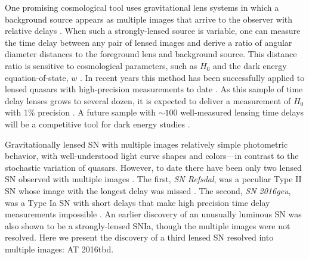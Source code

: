 \documentclass[12pt]{article}
\def\SNABC{AT 2016tbd\xspace}
\begin{document}
One promising cosmological tool uses %
gravitational lens systems in which a background
source appears as multiple images that arrive to the observer with relative delays \cite{einstein_lens_1936}.
When such a strongly-lensed source is variable, one can measure the time delay between any pair of lensed images and derive a ratio of angular diameter distances to the foreground lens and background source. 
This distance ratio is sensitive to cosmological parameters, such as 
$H_0$ \cite{refsdal_possibility_1964} and the dark energy equation-of-state, $w$ \cite{holz_seeing_2001}. 
In recent years this method has been successfully applied to lensed
quasars %
with  high-precision measurements to date . As this sample of time delay lenses grows to several dozen, it is expected to deliver a measurement of $H_0$ with 1\% precision \cite{suyu_cosmological_2018}. A future sample with $\sim100$ well-measured lensing time delays will be a competitive tool for dark energy studies \cite{treu_time_2016}.

Gravitationally lensed SN with multiple images 
 relatively simple photometric behavior, with well-understood light curve shapes and colors---in contrast to the stochastic variation of quasars.  However,  to date there have been only two lensed SN observed with multiple images \cite{kelly_multiple_2015,goobar_iptf16geu:_2017}. The first, {\it SN Refsdal}, was a peculiar Type II SN whose image with the longest delay was missed \cite{kelly_sn_2016}. The second, {\it SN 2016geu}, was a Type Ia SN with short delays that make high precision time delay measurements impossible \cite{dhawan_magnification_2019}. An earlier discovery of an unusually luminous SN \cite{chornock_ps1-10afx_2013} was also shown to be a strongly-lensed SNIa,  \cite{quimby_detection_2014} %
though the multiple images were not resolved.  
Here we present the discovery 
of a third lensed SN resolved into multiple images: \SNABC.
\end{document}
